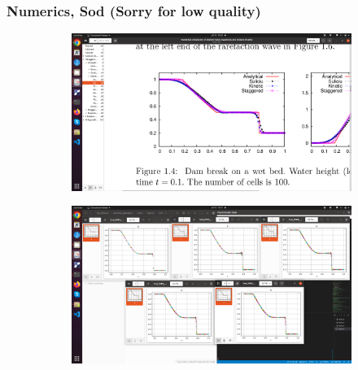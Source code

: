 \documentclass[pt12]{beamer}
\begin{document}
\begin{frame}
\frametitle{Numerics, Sod (Sorry for low quality)}


\begin{figure}
     \centering
     \begin{subfigure}[b]{0.3\textwidth}
         \centering
         \includegraphics[width=\textwidth]{figures/sod/reference.png}
     \end{subfigure}
     \begin{subfigure}[b]{0.8\textwidth}
         \centering
         \includegraphics[width=\textwidth]{figures/sod/my_results.png}
     \end{subfigure}
\end{figure}


\end{frame}
\end{document}

